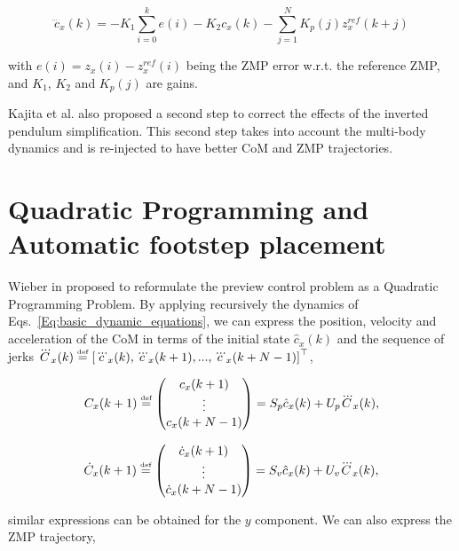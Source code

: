 \begin{equation}
\dddot{c}_x(k) = -K_1 \sum\limits_{i=0}^{k} e(i)-K_2c_x(k) - \sum\limits_{j=1}^{N} K_p(j)z_x^{ref}(k+j)
\end{equation}

with $e(i) = z_x(i) - z_x^{ref}(i)$ being the ZMP error w.r.t. the reference ZMP, and $K_1$, $K_2$ and $K_p(j)$ are gains.

Kajita et al. also proposed a second step to correct the effects of the inverted pendulum simplification. This second step takes into account the multi-body dynamics and is re-injected to have better CoM and ZMP trajectories.

\section{Quadratic Programming and Automatic footstep placement}

Wieber in \citep{WieberHumanoids2006} proposed to reformulate the preview control problem as a Quadratic Programming Problem. By applying recursively the dynamics of Eqs.~\ref{Eq:basic_dynamic_equations}, we can express the position, velocity and acceleration  of the CoM in terms of the initial state $\hat{c}_x(k)$ and the sequence of jerks $\dddot{ C}_x(k) \stackrel{\mbox{\tiny def}}{=} \left[ \dddot{c}_x(k), \dddot{c}_x(k+1),...,\dddot{c}_x(k+N-1) \right]^{\top}$,

\begin{equation}
 \label{Eq:PosCMHorizon}
 {C}_x(k+1) \stackrel{\mbox{\tiny def}}{=}  \left(
 \begin{matrix}
  c_x(k+1) \\
  \vdots \\
  c_x(k+N-1)
 \end{matrix}
 \right) = {S}_p \hat{c}_x(k) + { U}_p \dddot{C}_x(k),
\end{equation}

\begin{equation}
 \label{Eq:VelCMHorizon}
 \dot{C}_x(k+1) \stackrel{\mbox{\tiny def}}{=}  \left(
 \begin{matrix}
  \dot{c}_x(k+1) \\
  \vdots \\
  \dot{c}_x(k+N-1)
 \end{matrix}
 \right) = {S}_v \hat{c}_x(k) + { U}_v \dddot{ C}_x(k),
\end{equation}

similar expressions can be obtained for the $y$ component. We can also express the ZMP trajectory,

